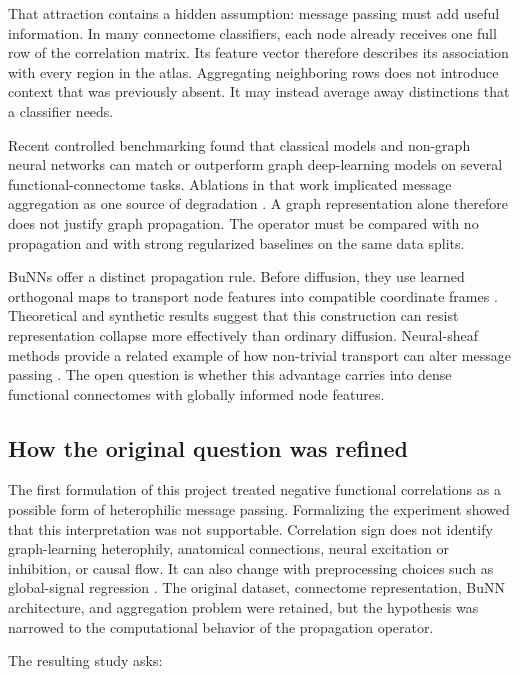 \documentclass[11pt,a4paper]{article}
\begin{document}
That attraction contains a hidden assumption: message passing must add useful
information. In many connectome classifiers, each node already receives one
full row of the correlation matrix. Its feature vector therefore describes
its association with every region in the atlas. Aggregating neighboring rows
does not introduce context that was previously absent. It may instead average
away distinctions that a classifier needs.

Recent controlled benchmarking found that classical models and non-graph
neural networks can match or outperform graph deep-learning models on several
functional-connectome tasks. Ablations in that work implicated message
aggregation as one source of degradation \cite{han2026rethinking}. A graph
representation alone therefore does not justify graph propagation. The
operator must be compared with no propagation and with strong regularized
baselines on the same data splits.

BuNNs offer a distinct propagation rule. Before diffusion, they use learned
orthogonal maps to transport node features into compatible coordinate frames
\cite{bamberger2025bundle}. Theoretical and synthetic results suggest that this
construction can resist representation collapse more effectively than
ordinary diffusion. Neural-sheaf methods provide a related example of how
non-trivial transport can alter message passing \cite{bodnar2022sheaf}. The
open question is whether this advantage carries into dense functional
connectomes with globally informed node features.

\subsection{How the original question was refined}

The first formulation of this project treated negative functional
correlations as a possible form of heterophilic message passing. Formalizing
the experiment showed that this interpretation was not supportable.
Correlation sign does not identify graph-learning heterophily, anatomical
connections, neural excitation or inhibition, or causal flow. It can also
change with preprocessing choices such as global-signal regression
\cite{murphy2017global}. The original dataset, connectome representation, BuNN
architecture, and aggregation problem were retained, but the hypothesis was
narrowed to the computational behavior of the propagation operator.

The resulting study asks:
\end{document}
